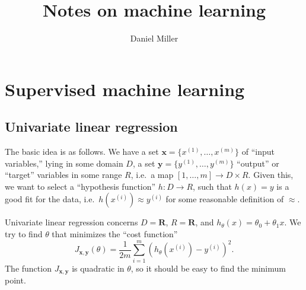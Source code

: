 \documentclass{article}
\title{Notes on machine learning}
\author{Daniel Miller}
\newcommand{\bR}{\mathbf{R}}
\newcommand{\bx}{\mathbf{x}}
\newcommand{\by}{\mathbf{y}}
\begin{document}
\maketitle





\section{Supervised machine learning}


\subsection{Univariate linear regression}

The basic idea is as follows. We have a set $\bx=\{x^{(1)},\dots,x^{(m)}\}$ of 
``input variables,'' lying in some domain $D$, a set 
$\by=\{y^{(1)},\dots,y^{(m)}\}$ ``output'' or ``target'' variables in some 
range $R$, i.e.~a map $[1,\dots,m]\to D\times R$. Given this, we want to select 
a ``hypothesis function'' $h\colon D\to R$, such that $h(x)=y$ is a good fit 
for the data, i.e.~$h(x^{(i)})\approx y^{(i)}$ for some reasonable definition 
of $\approx$. 

Univariate linear regression concerns $D=\bR$, $R=\bR$, and 
$h_\theta(x)=\theta_0+\theta_1 x$. We try to find $\theta$ that minimizes the 
``cost function'' 
\[
	J_{\bx,\by}(\theta) = \frac{1}{2m} \sum_{i=1}^m (h_\theta(x^{(i)}) - y^{(i)})^2 .
\]
The function $J_{\bx,\by}$ is quadratic in $\theta$, so it should be easy to 
find the minimum point.
\end{document}
